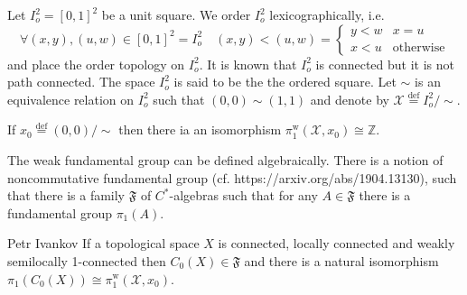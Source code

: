 \documentclass{beamer}
\theoremstyle{plain}
\newcommand{\sX}{\mathcal{X}}       %
\newcommand{\bydef}{\stackrel{\mathrm{def}}{=}}
\begin{document}
\begin{frame}
		Let $I^2_o = \left[0,1\right]^2$ be a unit square. We order $I^2_o$ lexicographically, i.e.
	$$
	\forall (x, y),(u, w) \in \left[0,1\right]^2 = I^2_o \quad (x, y)< (u, w)  = \begin{cases}
		y < w & x = u\\
		x < u & \text{otherwise}
	\end{cases}
	$$
	and place the order topology on $I^2_o$. It is known that $I^2_o$ is connected but it is not path connected.
	The space $I^2_o$ is said to be the \alert{the ordered square}.
	Let $\sim$ is an equivalence relation on  $I^2_o$ such that $\left(0, 0 \right)\sim \left(1, 1 \right)$ and denote by $\sX \bydef I^2_o/\sim$.
	\begin{lemma}
	If $x_0 \bydef \left(0, 0 \right)/\sim$ then there ia an isomorphism  $	\pi^{\text{w}}_1\left(\sX, x_0\right)\cong\mathbb{Z}$.
	\end{lemma}
\end{frame}
\begin{frame}
The weak fundamental group can be defined algebraically. There is a notion of noncommutative fundamental group (cf. https://arxiv.org/abs/1904.13130), such that there is a family $\mathfrak F$ of $C^*$-algebras such that for any $A\in \mathfrak F$ there is a fundamental group $\pi_1\left(A \right)$. 
\begin{theorem}\alert{Petr Ivankov}
If a topological space $X$ is connected, locally connected and weakly semilocally 1-connected then $C_0\left(X \right) \in \mathfrak F$ and there is a natural isomorphism $\pi_1\left( C_0\left(X \right)\right)  \cong \pi^{\text{w}}_1\left(\sX, x_0\right)$.
\end{theorem}
\end{frame}
\end{document}
